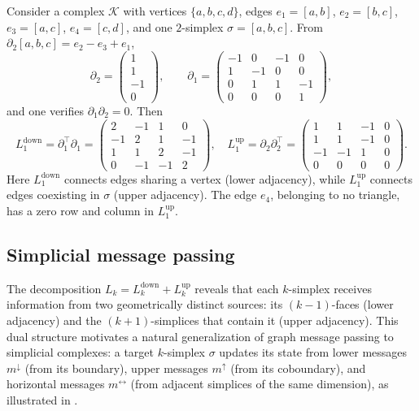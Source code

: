 \begin{example}
\label{ex:graphs:hodge-L1}
Consider a complex $\mathcal{K}$ with vertices $\{a, b, c, d\}$, edges
$e_1 = [a,b]$, $e_2 = [b,c]$, $e_3 = [a,c]$, $e_4 = [c,d]$, and one $2$-simplex
$\sigma = [a,b,c]$. From $\partial_2[a,b,c] = e_2 - e_3 + e_1$,
\[
  \partial_2 = \begin{pmatrix} 1 \\ 1 \\ -1 \\ 0 \end{pmatrix}, \qquad
  \partial_1 = \begin{pmatrix}
    -1 & 0 & -1 & 0 \\ 1 & -1 & 0 & 0 \\ 0 & 1 & 1 & -1 \\ 0 & 0 & 0 & 1
  \end{pmatrix},
\]
and one verifies $\partial_1 \partial_2 = 0$. Then
\[
  L_1^{\mathrm{down}} = \partial_1^\top \partial_1 = \begin{pmatrix}
    2 & -1 & 1 & 0 \\ -1 & 2 & 1 & -1 \\ 1 & 1 & 2 & -1 \\ 0 & -1 & -1 & 2
  \end{pmatrix}, \quad
  L_1^{\mathrm{up}} = \partial_2 \partial_2^\top = \begin{pmatrix}
    1 & 1 & -1 & 0 \\ 1 & 1 & -1 & 0 \\ -1 & -1 & 1 & 0 \\ 0 & 0 & 0 & 0
  \end{pmatrix}.
\]
Here $L_1^{\mathrm{down}}$ connects edges sharing a vertex (lower adjacency),
while $L_1^{\mathrm{up}}$ connects edges coexisting in $\sigma$ (upper
adjacency). The edge $e_4$, belonging to no triangle, has a zero row and column
in $L_1^{\mathrm{up}}$.
\end{example}

\subsection{Simplicial message passing}
\label{sec:graphs:simplicial-mp}

The decomposition $L_k = L_k^{\mathrm{down}} + L_k^{\mathrm{up}}$ reveals that
each $k$-simplex receives information from two geometrically distinct sources:
its $(k{-}1)$-faces (lower adjacency) and the $(k{+}1)$-simplices that contain it
(upper adjacency). This dual structure motivates a natural generalization of
graph message passing to simplicial complexes: a target $k$-simplex $\sigma$
updates its state from lower messages $m^{\downarrow}$ (from its boundary), upper
messages $m^{\uparrow}$ (from its coboundary), and horizontal messages
$m^{\leftrightarrow}$ (from adjacent simplices of the same dimension), as
illustrated in .

